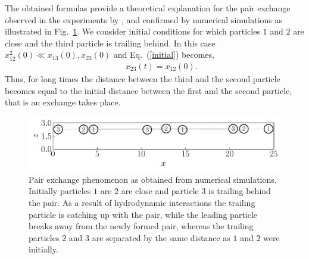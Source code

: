 The obtained formulas provide a theoretical explanation for the pair exchange observed in the experiments by \cite{tab0}, and confirmed by numerical
simulations as illustrated in Fig.\ \ref{fig: pair}. We consider initial conditions for which particles $1$ and $2$ are close and the third particle is trailing behind. In this case $x^2_{12}(0)\ll x_{13}(0),x_{23}(0)$ and Eq.~(\ref{initial}) becomes,
\begin{eqnarray}&&\!\!\!\!\!\!\!\!\!\!\!\!\!\!\!\!
x_{23}(t)=x_{12}(0).\label{initialp}
\end{eqnarray}
Thus, for long times the distance between the third and the second particle becomes equal to the initial distance between the first and the second particle, that is an exchange takes place.

\begin{figure}[t!]
 \begin{center}
\includegraphics[width=1.\columnwidth]{channel_sphere_pair_ex4.pdf}
\end{center}
  \caption{Pair exchange phenomenon as obtained from numerical simulations. Initially particles $1$ are $2$ are close and particle $3$ is trailing behind the pair. As a result of hydrodynamic interactions the trailing particle is catching up with the pair, while the leading particle breaks away from the newly formed pair, whereas  the trailing particles $2$ and $3$ are separated by the same distance as $1$ and $2$ were initially.}
 \label{fig: pair}
\end{figure}


